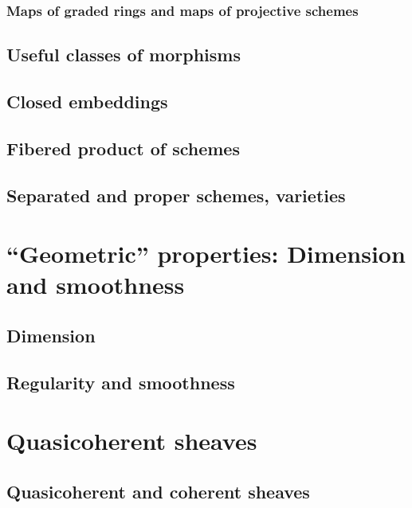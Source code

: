 \documentclass[11pt]{book} %
\begin{document}
\section{Maps of graded rings and maps of projective schemes}

\chapter{Useful classes of morphisms}
\chapter{Closed embeddings}
\chapter{Fibered product of schemes}
\chapter{Separated and proper schemes, varieties}
\part{``Geometric'' properties: Dimension and smoothness}
\chapter{Dimension}

\chapter{Regularity and smoothness}

\part{Quasicoherent sheaves}
\chapter{Quasicoherent and coherent sheaves}
\end{document}
